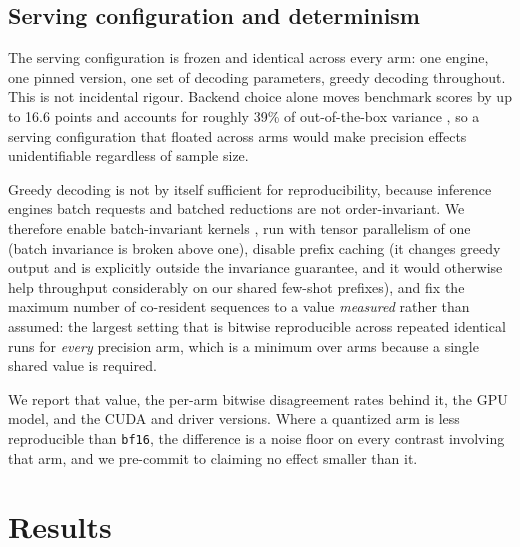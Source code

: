 \documentclass[11pt]{article}
\newcommand{\todo}[1]{\textcolor{red}{[\textbf{TODO:} #1]}}
\begin{document}
\subsection{Serving configuration and determinism}
\label{sec:determinism}
The serving configuration is frozen and identical across every arm: one engine,
one pinned version, one set of decoding parameters, greedy decoding throughout.
This is not incidental rigour. Backend choice alone moves benchmark scores by up
to 16.6 points \citep{pape2026silent} and accounts for roughly 39\% of
out-of-the-box variance \citep{masoudian2026sideeffect}, so a serving
configuration that floated across arms would make precision effects
unidentifiable regardless of sample size.

Greedy decoding is not by itself sufficient for reproducibility, because
inference engines batch requests and batched reductions are not
order-invariant. We therefore enable batch-invariant kernels \citep{he2025nondeterminism},
run with tensor
parallelism of one (batch invariance is broken above one), disable prefix
caching (it changes greedy output and is explicitly outside the invariance
guarantee, and it would otherwise help throughput considerably on our shared
few-shot prefixes), and fix the maximum number of co-resident sequences to a
value \emph{measured} rather than assumed: the largest setting that is bitwise
reproducible across repeated identical runs for \emph{every} precision arm, which
is a minimum over arms because a single shared value is required.

We report that value, the per-arm bitwise disagreement rates behind it, the GPU
model, and the CUDA and driver versions. Where a quantized arm is less
reproducible than \texttt{bf16}, the difference is a noise floor on every
contrast involving that arm, and we pre-commit to claiming no effect smaller
than it.

\section{Results}
\label{sec:results}
%
\end{document}
